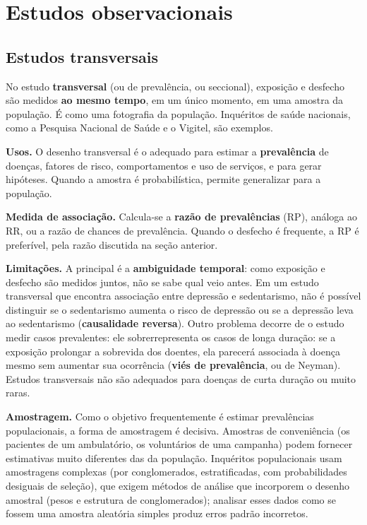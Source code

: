\documentclass[
]{book}
\begin{document}
\section{Estudos observacionais}\label{estudos-observacionais}

\subsection{Estudos transversais}\label{estudos-transversais}

No estudo \textbf{transversal} (ou de prevalência, ou seccional), exposição e desfecho são medidos \textbf{ao mesmo tempo}, em um único momento, em uma amostra da população. É como uma fotografia da população. Inquéritos de saúde nacionais, como a Pesquisa Nacional de Saúde e o Vigitel, são exemplos.

\textbf{Usos.} O desenho transversal é o adequado para estimar a \textbf{prevalência} de doenças, fatores de risco, comportamentos e uso de serviços, e para gerar hipóteses. Quando a amostra é probabilística, permite generalizar para a população.

\textbf{Medida de associação.} Calcula-se a \textbf{razão de prevalências} (RP), análoga ao RR, ou a razão de chances de prevalência. Quando o desfecho é frequente, a RP é preferível, pela razão discutida na seção anterior.

\textbf{Limitações.} A principal é a \textbf{ambiguidade temporal}: como exposição e desfecho são medidos juntos, não se sabe qual veio antes. Em um estudo transversal que encontra associação entre depressão e sedentarismo, não é possível distinguir se o sedentarismo aumenta o risco de depressão ou se a depressão leva ao sedentarismo (\textbf{causalidade reversa}). Outro problema decorre de o estudo medir casos prevalentes: ele sobrerrepresenta os casos de longa duração: se a exposição prolongar a sobrevida dos doentes, ela parecerá associada à doença mesmo sem aumentar sua ocorrência (\textbf{viés de prevalência}, ou de Neyman). Estudos transversais não são adequados para doenças de curta duração ou muito raras.

\textbf{Amostragem.} Como o objetivo frequentemente é estimar prevalências populacionais, a forma de amostragem é decisiva. Amostras de conveniência (os pacientes de um ambulatório, os voluntários de uma campanha) podem fornecer estimativas muito diferentes das da população. Inquéritos populacionais usam amostragens complexas (por conglomerados, estratificadas, com probabilidades desiguais de seleção), que exigem métodos de análise que incorporem o desenho amostral (pesos e estrutura de conglomerados); analisar esses dados como se fossem uma amostra aleatória simples produz erros padrão incorretos.
\end{document}
